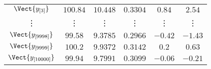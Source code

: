\documentclass[10pt]{report}
\begin{document}
\begin{exercice}
\begin{enumerate}
\begin{center}
\begin{tabular}{c|ccccc}
    
        $\Vect{y_{[3]}}$
         & 
    
        $100.84$
         & 
    
        $10.448$
         & 
    
        $0.3304$
         & 
    
        $0.84$
         & 
    
        $2.54$
        
    \\ 

    
        \vdots
         & 
    
        \vdots
         & 
    
        \vdots
         & 
    
        \vdots
         & 
    
        \vdots
         & 
    
        \vdots
        
    \\ 

    
        $\Vect{y_{[9998]}}$
         & 
    
        $99.58$
         & 
    
        $9.3785$
         & 
    
        $0.2966$
         & 
    
        $-0.42$
         & 
    
        $-1.43$
        
    \\ 

    
        $\Vect{y_{[9999]}}$
         & 
    
        $100.2$
         & 
    
        $9.9372$
         & 
    
        $0.3142$
         & 
    
        $0.2$
         & 
    
        $0.63$
        
    \\ 

    
        $\Vect{y_{[10000]}}$
         & 
    
        $99.94$
         & 
    
        $9.7991$
         & 
    
        $0.3099$
         & 
    
        $-0.06$
         & 
    
        $-0.21$
        
    \\ \cline{1-6}


\end{tabular}
\end{center}
\end{enumerate}
\end{exercice}
\end{document}
